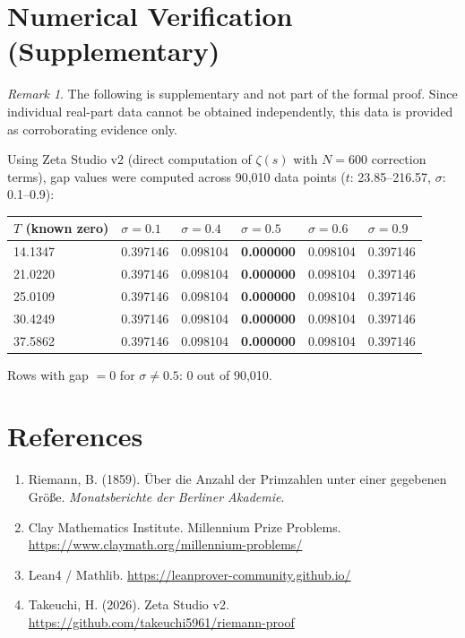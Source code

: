 \documentclass[12pt]{article}
\theoremstyle{definition}
\theoremstyle{remark}
\newtheorem{remark}{Remark}
\begin{document}
\section{Numerical Verification (Supplementary)}

\begin{remark}
The following is supplementary and not part of the formal proof. Since individual real-part data cannot be obtained independently, this data is provided as corroborating evidence only.
\end{remark}

Using Zeta Studio v2 (direct computation of $\zeta(s)$ with $N=600$ correction terms), gap values were computed across 90,010 data points ($t$: 23.85--216.57, $\sigma$: 0.1--0.9):

\begin{center}
\begin{tabular}{llllll}
\toprule
$T$ (known zero) & $\sigma=0.1$ & $\sigma=0.4$ & $\sigma=0.5$ & $\sigma=0.6$ & $\sigma=0.9$ \\
\midrule
14.1347 & 0.397146 & 0.098104 & \textbf{0.000000} & 0.098104 & 0.397146 \\
21.0220 & 0.397146 & 0.098104 & \textbf{0.000000} & 0.098104 & 0.397146 \\
25.0109 & 0.397146 & 0.098104 & \textbf{0.000000} & 0.098104 & 0.397146 \\
30.4249 & 0.397146 & 0.098104 & \textbf{0.000000} & 0.098104 & 0.397146 \\
37.5862 & 0.397146 & 0.098104 & \textbf{0.000000} & 0.098104 & 0.397146 \\
\bottomrule
\end{tabular}
\end{center}

Rows with gap $= 0$ for $\sigma \neq 0.5$: 0 out of 90,010.

\section*{References}

\begin{enumerate}
\item Riemann, B. (1859). \"{U}ber die Anzahl der Primzahlen unter einer gegebenen Gr\"{o}\ss e. \textit{Monatsberichte der Berliner Akademie}.
\item Clay Mathematics Institute. Millennium Prize Problems. \url{https://www.claymath.org/millennium-problems/}
\item Lean4 / Mathlib. \url{https://leanprover-community.github.io/}
\item Takeuchi, H. (2026). Zeta Studio v2. \url{https://github.com/takeuchi5961/riemann-proof}
\end{enumerate}
\end{document}
